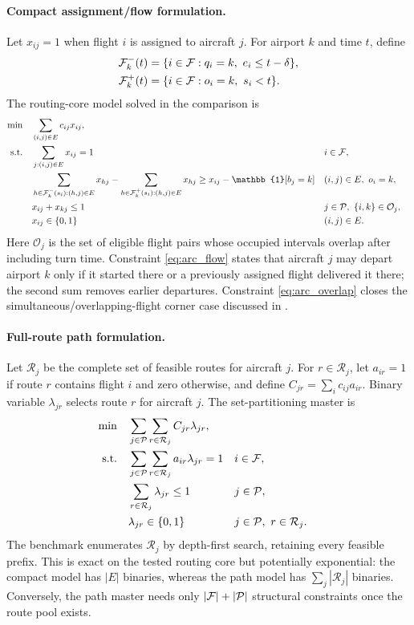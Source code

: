 \paragraph{Compact assignment/flow formulation.}
Let $x_{ij}=1$ when flight $i$ is assigned to aircraft $j$.  For airport $k$
and time $t$, define
\begin{align}
  \mathcal{F}_k^-(t)&=\{i\in\mathcal{F}:q_i=k,\ e_i\leq t-\delta\},\\
  \mathcal{F}_k^+(t)&=\{i\in\mathcal{F}:o_i=k,\ s_i<t\}.
\end{align}
The routing-core model solved in the comparison is
\begin{align}
 \min\quad & \sum_{(i,j)\in E}c_{ij}x_{ij},
   \label{eq:arc_obj}\\
 \text{s.t.}\quad
 &\sum_{j:(i,j)\in E}x_{ij}=1 && i\in\F,
   \label{eq:arc_cover}\\
 &\sum_{h\in\F_k^-(s_i):(h,j)\in E}x_{hj}
  -\sum_{h\in\F_k^+(s_i):(h,j)\in E}x_{hj}
  \geq x_{ij}-\mathbb{1}[b_j=k]
  && (i,j)\in E,\ o_i=k,
   \label{eq:arc_flow}\\
 &x_{ij}+x_{kj}\leq1
  && j\in\Pc,\ \{i,k\}\in\mathcal O_j,
   \label{eq:arc_overlap}\\
 &x_{ij}\in\{0,1\} &&(i,j)\in E.
   \label{eq:arc_domain}
\end{align}
Here $\mathcal O_j$ is the set of eligible flight pairs whose occupied
intervals overlap after including turn time.  Constraint
\eqref{eq:arc_flow} states that aircraft $j$ may depart airport $k$ only if it
started there or a previously assigned flight delivered it there; the second
sum removes earlier departures.  Constraint \eqref{eq:arc_overlap} closes the
simultaneous/overlapping-flight corner case discussed in .

\paragraph{Full-route path formulation.}
Let $\mathcal R_j$ be the complete set of feasible routes for aircraft $j$.
For $r\in\mathcal R_j$, let $a_{ir}=1$ if route $r$ contains flight $i$ and
zero otherwise, and define $C_{jr}=\sum_i c_{ij}a_{ir}$.  Binary variable
$\lambda_{jr}$ selects route $r$ for aircraft $j$.  The set-partitioning
master is
\begin{align}
 \min\quad &\sum_{j\in\mathcal{P}}\sum_{r\in\mathcal R_j}C_{jr}\lambda_{jr},
   \label{eq:path_obj}\\
 \text{s.t.}\quad
 &\sum_{j\in\mathcal{P}}\sum_{r\in\mathcal R_j}a_{ir}\lambda_{jr}=1
   &&i\in\mathcal{F},
   \label{eq:path_cover}\\
 &\sum_{r\in\mathcal R_j}\lambda_{jr}\leq1
   &&j\in\mathcal{P},
   \label{eq:path_one_route}\\
 &\lambda_{jr}\in\{0,1\}
   &&j\in\mathcal{P},\ r\in\mathcal R_j.
   \label{eq:path_domain}
\end{align}
The benchmark enumerates $\mathcal R_j$ by depth-first search, retaining every
feasible prefix.  This is exact on the tested routing core but potentially
exponential: the compact model has $|E|$ binaries, whereas the path model has
$\sum_j|\mathcal R_j|$ binaries.  Conversely, the path master needs only
$|\mathcal{F}|+|\mathcal{P}|$ structural constraints once the route pool exists.

